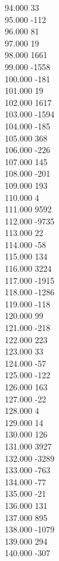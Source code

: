 { 94.000	33 \\
 95.000	-112 \\
 96.000	81 \\
 97.000	19 \\
 98.000	1661 \\
 99.000	-1558 \\
 100.000	-181 \\
 101.000	19 \\
 102.000	1617 \\
 103.000	-1594 \\
 104.000	-185 \\
 105.000	368 \\
 106.000	-226 \\
 107.000	145 \\
 108.000	-201 \\
 109.000	193 \\
 110.000	4 \\
 111.000	9592 \\
 112.000	-9735 \\
 113.000	22 \\
 114.000	-58 \\
 115.000	134 \\
 116.000	3224 \\
 117.000	-1915 \\
 118.000	-1286 \\
 119.000	-118 \\
 120.000	99 \\
 121.000	-218 \\
 122.000	223 \\
 123.000	33 \\
 124.000	-57 \\
 125.000	-122 \\
 126.000	163 \\
 127.000	-22 \\
 128.000	4 \\
 129.000	14 \\
 130.000	126 \\
 131.000	3927 \\
 132.000	-3289 \\
 133.000	-763 \\
 134.000	-77 \\
 135.000	-21 \\
 136.000	131 \\
 137.000	895 \\
 138.000	-1079 \\
 139.000	294 \\
 140.000	-307 \\
}
